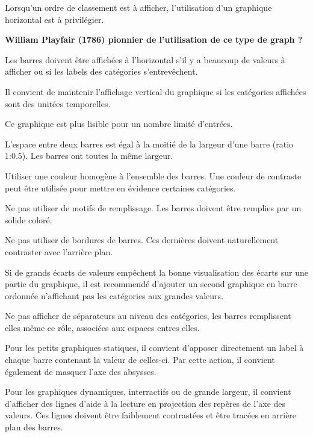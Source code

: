 \documentclass[a4paper,12pt]{article}
\begin{document}
\begin{multicols}{2}
Lorsqu'un ordre de classement est à afficher, l'utilisation d'un graphique horizontal est à privilégier. \autocite{andreaskrauseBestPracticesData2024}

\textbf{William Playfair (1786) pionnier de l'utilisation de ce type de graph ?}

Les barres doivent être affichées à l'horizontal s'il y a beaucoup de valeurs à afficher ou si les labels des catégories s'entrevêchent. \autocite{alansmithLexiqueVisuel,sosulskiGraphics2019,wilkeVisualizingAmounts2019,stephenfewComponentlevelGraphDesign2012,jonathanschwabishComparingCategories2021}

Il convient de maintenir l'affichage vertical du graphique si les catégories affichées sont des unitées temporelles. \autocite{stephenfewComponentlevelGraphDesign2012}

Ce graphique est plus lisible pour un nombre limité d'entrées. \autocite{mikeyiHowChooseRight2020}

L'espace entre deux barres est égal à la moitié de la largeur d'une barre (ratio 1:0.5). Les barres ont toutes la même largeur. \autocite{stephenfewComponentlevelGraphDesign2012}

Utiliser une couleur homogène à l'ensemble des barres. Une couleur de contraste peut être utilisée pour mettre en évidence certaines catégories.

Ne pas utiliser de motifs de remplissage. Les barres doivent être remplies par un solide coloré. \autocite{stephenfewComponentlevelGraphDesign2012}

Ne pas utiliser de bordures de barres. Ces dernières doivent naturellement contraster avec l'arrière plan.

Si de grands écarts de valeurs empêchent la bonne visualisation des écarts sur une partie du graphique, il est recommendé d'ajouter un second graphique en barre ordonnée n'affichant pas les catégories aux grandes valeurs. \autocite{jonathanschwabishComparingCategories2021}

Ne pas afficher de séparateurs au niveau des catégories, les barres remplissent elles même ce rôle, associées aux espaces entres elles. \autocite{jonathanschwabishComparingCategories2021}

Pour les petits graphiques statiques, il convient d'apposer directement un label à chaque barre contenant la valeur de celles-ci. Par cette action, il convient également de masquer l'axe des absysses. \autocite{jonathanschwabishComparingCategories2021}

Pour les graphiques dynamiques, interractifs ou de grande largeur, il convient d'afficher des lignes d'aide à la lecture en projection des repères de l'axe des valeurs. Ces lignes doivent être faiblement contrastées et être tracées en arrière plan des barres. \autocite{jonathanschwabishComparingCategories2021}


\end{multicols}
\end{document}
